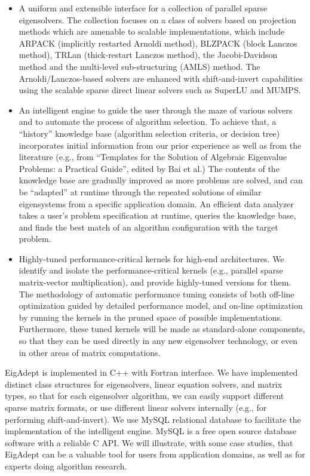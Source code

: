\documentclass{report}
\begin{document}
\begin{itemize}
\item A uniform and extensible interface for a collection
of parallel sparse eigensolvers. The collection focuses on a
class of solvers based on projection methods which are
amenable to scalable implementations, which include ARPACK
(implicitly restarted Arnoldi method), BLZPACK (block
Lanczos method), TRLan (thick-restart Lanczos method), the
Jacobi-Davidson method and the multi-level sub-structuring
(AMLS) method. The Arnoldi/Lanczos-based solvers are
enhanced with shift-and-invert capabilities using the
scalable sparse direct linear solvers such as SuperLU and
MUMPS.

\item An intelligent engine to guide the user
through the maze of various solvers and to automate the
process of algorithm selection. To achieve that, a ``history''
knowledge base (algorithm selection criteria, or decision
tree) incorporates initial information from our prior
experience as well as from the literature (e.g., from
``Templates for the Solution of Algebraic Eigenvalue
Problems: a Practical Guide'', edited by Bai et al.) The
contents of the knowledge base are gradually improved as
more problems are solved, and can be ``adapted'' at runtime
through the repeated solutions of similar eigensystems from
a specific application domain. An efficient data analyzer
takes a user's problem specification at runtime, queries the
knowledge base, and finds the best match of an algorithm
configuration with the target problem.

\item Highly-tuned
performance-critical kernels for high-end architectures. We
identify and isolate the performance-critical kernels (e.g.,
parallel sparse matrix-vector multiplication), and provide
highly-tuned versions for them. The methodology of automatic
performance tuning consists of both off-line optimization
guided by detailed performance model, and on-line
optimization by running the kernels in the pruned space of
possible implementations. Furthermore, these tuned kernels
will be made as standard-alone components, so that they can
be used directly in any new eigensolver technology, or even
in other areas of matrix computations.
\end{itemize}

EigAdept is implemented in C++ with Fortran interface. We
have implemented distinct class structures for eigensolvers,
linear equation solvers, and matrix types, so that for each
eigensolver algorithm, we can easily support different
sparse matrix formats, or use different linear solvers
internally (e.g., for performing shift-and-invert). We use
MySQL relational database to facilitate the implementation
of the intelligent engine. MySQL is a free open source
database software with a reliable C API. We will illustrate,
with some case studies, that EigAdept can be a valuable tool
for users from application domains, as well as for experts
doing algorithm research.



\end{document}
